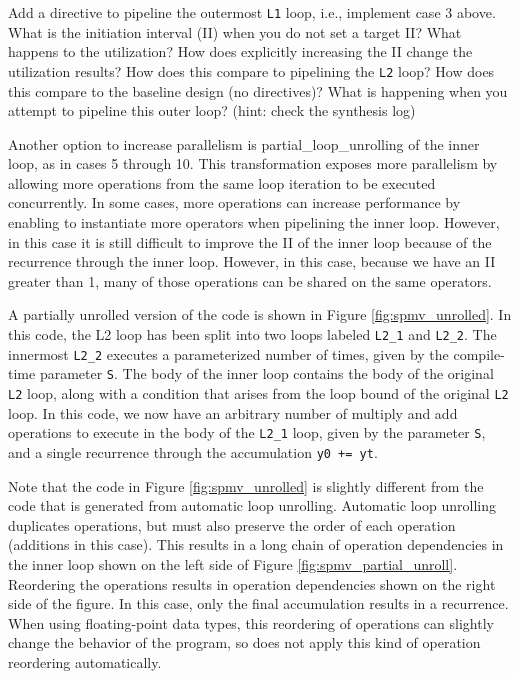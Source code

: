 \begin{exercise}
Add a directive to pipeline the outermost \lstinline{L1} loop, i.e., implement case 3 above. What is the initiation interval (II) when you do not set a target II? What happens to the utilization? How does explicitly increasing the II change the utilization results? How does this compare to pipelining the \lstinline{L2} loop? How does this compare to the baseline design (no directives)? What is happening when you attempt to pipeline this outer loop? (hint: check the synthesis log)
\end{exercise}

Another option to increase parallelism is \gls{partial_loop_unrolling} of the inner loop, as in cases 5 through 10.  This transformation exposes more parallelism by allowing more operations from the same loop iteration to be executed concurrently.   In some cases, more operations can increase performance by enabling \VHLS to instantiate more operators when pipelining the inner loop.  However, in this case it is still difficult to improve the II of the inner loop because of the recurrence through the inner loop.  However, in this case, because we have an II greater than 1, many of those operations can be shared on the same operators. 

A partially unrolled version of the code is shown in Figure \ref{fig:spmv_unrolled}.  In this code, the L2 loop has been split into two loops labeled \lstinline|L2_1| and \lstinline|L2_2|.  The innermost \lstinline|L2_2| executes a parameterized number of times, given by the compile-time parameter \lstinline|S|.  The body of the inner loop contains the body of the original \lstinline|L2| loop, along with a condition that arises from the loop bound of the original \lstinline|L2| loop.  In this code, we now have an arbitrary number of multiply and add operations to execute in the body of the \lstinline|L2_1| loop, given by the parameter \lstinline|S|, and a single recurrence through the accumulation \lstinline|y0 += yt|.

Note that the code in Figure \ref{fig:spmv_unrolled} is slightly different from the code that is generated from automatic loop unrolling.  Automatic loop unrolling duplicates operations, but must also preserve the order of each operation (additions in this case).  This results in a long chain of operation dependencies in the inner loop shown on the left side of Figure \ref{fig:spmv_partial_unroll}.  Reordering the operations results in operation dependencies shown on the right side of the figure.  In this case, only the final accumulation results in a recurrence.   When using floating-point data types, this reordering of operations can slightly change the behavior of the program, so \VHLS does not apply this kind of operation reordering automatically.  

